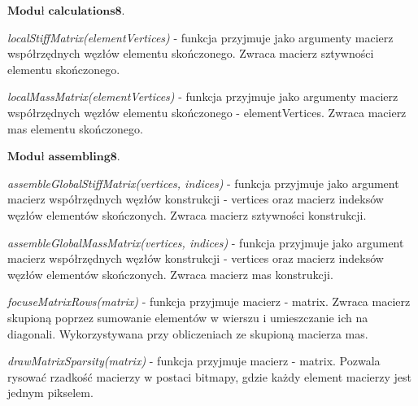  \( \textbf{Moduł calculations8} \).

\textit{localStiffMatrix(elementVertices)} - funkcja przyjmuje jako argumenty macierz współrzędnych węzłów elementu skończonego. Zwraca macierz sztywności elementu skończonego.

\textit{localMassMatrix(elementVertices)} - funkcja przyjmuje jako argumenty macierz współrzędnych węzłów elementu skończonego - elementVertices. Zwraca macierz mas elementu skończonego.

 \( \textbf{Moduł assembling8} \).

\textit{assembleGlobalStiffMatrix(vertices, indices)} - funkcja przyjmuje jako argument macierz współrzędnych węzłów konstrukcji - vertices oraz macierz indeksów węzłów elementów skończonych. Zwraca macierz sztywności konstrukcji.

\textit{assembleGlobalMassMatrix(vertices, indices)} - funkcja przyjmuje jako argument macierz współrzędnych węzłów konstrukcji - vertices oraz macierz indeksów węzłów elementów skończonych. Zwraca macierz mas konstrukcji.

\textit{focuseMatrixRows(matrix)} - funkcja przyjmuje macierz - matrix. Zwraca macierz skupioną poprzez sumowanie elementów w wierszu i umieszczanie ich na diagonali. Wykorzystywana przy obliczeniach ze skupioną macierza mas.

\textit{drawMatrixSparsity(matrix)} - funkcja przyjmuje macierz - matrix. Pozwala rysować rzadkość macierzy w postaci bitmapy, gdzie każdy element macierzy jest jednym pikselem.